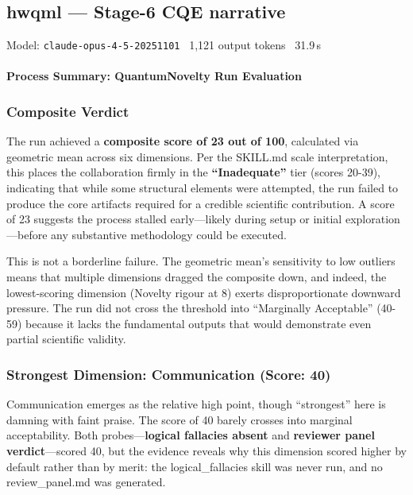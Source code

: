 \documentclass[10pt,letterpaper]{article}
\begin{document}
\subsection{hwqml --- Stage-6 CQE narrative}
\noindent\textcolor{muted}{\small Model: \texttt{claude-opus-4-5-20251101} \textperiodcentered\ 1,121 output tokens \textperiodcentered\ 31.9\,s}

\hypertarget{process-summary-quantumnovelty-run-evaluation}{%
\paragraph{Process Summary: QuantumNovelty Run Evaluation}\label{process-summary-quantumnovelty-run-evaluation}}

\hypertarget{composite-verdict}{%
\subsubsection{Composite Verdict}\label{composite-verdict}}

The run achieved a \textbf{composite score of 23 out of 100}, calculated via geometric mean across six dimensions. Per the SKILL.md scale interpretation, this places the collaboration firmly in the \textbf{``Inadequate''} tier (scores 20-39), indicating that while some structural elements were attempted, the run failed to produce the core artifacts required for a credible scientific contribution. A score of 23 suggests the process stalled early---likely during setup or initial exploration---before any substantive methodology could be executed.

This is not a borderline failure. The geometric mean's sensitivity to low outliers means that multiple dimensions dragged the composite down, and indeed, the lowest-scoring dimension (Novelty rigour at 8) exerts disproportionate downward pressure. The run did not cross the threshold into ``Marginally Acceptable'' (40-59) because it lacks the fundamental outputs that would demonstrate even partial scientific validity.

\hypertarget{strongest-dimension-communication-score-40}{%
\subsubsection{Strongest Dimension: Communication (Score: 40)}\label{strongest-dimension-communication-score-40}}

Communication emerges as the relative high point, though ``strongest'' here is damning with faint praise. The score of 40 barely crosses into marginal acceptability. Both probes---\textbf{logical fallacies absent} and \textbf{reviewer panel verdict}---scored 40, but the evidence reveals why this dimension scored higher by default rather than by merit: the logical\_fallacies skill was never run, and no review\_panel.md was generated.
\end{document}
